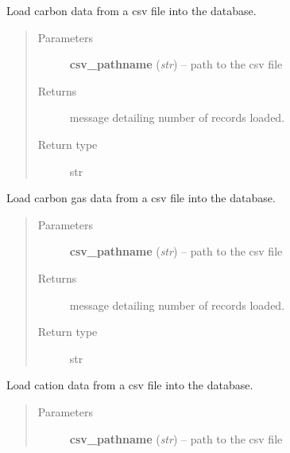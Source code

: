 \documentclass[letterpaper,10pt,english]{sphinxmanual}
\begin{document}
\begin{fulllineitems}
\begin{fulllineitems}
\label{modules:webb_utils.upload_data.UploadData.load_carbon_data}
Load carbon data from a csv file into the database.
\begin{quote}\begin{description}
\item[{Parameters}] \leavevmode
\textbf{csv\_pathname} (\emph{str}) -- path to the csv file

\item[{Returns}] \leavevmode
message detailing number of records loaded.

\item[{Return type}] \leavevmode
str

\end{description}\end{quote}

\end{fulllineitems}


\begin{fulllineitems}
\label{modules:webb_utils.upload_data.UploadData.load_carbon_gas_data}
Load carbon gas data from a csv file into the database.
\begin{quote}\begin{description}
\item[{Parameters}] \leavevmode
\textbf{csv\_pathname} (\emph{str}) -- path to the csv file

\item[{Returns}] \leavevmode
message detailing number of records loaded.

\item[{Return type}] \leavevmode
str

\end{description}\end{quote}

\end{fulllineitems}


\begin{fulllineitems}
\label{modules:webb_utils.upload_data.UploadData.load_cation_data}
Load cation data from a csv file into the database.
\begin{quote}\begin{description}
\item[{Parameters}] \leavevmode
\textbf{csv\_pathname} (\emph{str}) -- path to the csv file


\end{description}
\end{quote}
\end{fulllineitems}
\end{fulllineitems}
\end{document}
